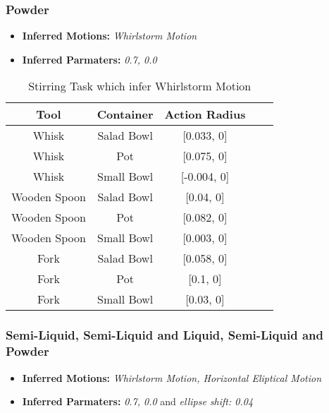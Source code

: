 \subsubsection*{Powder}
\begin{itemize}
    \item \textbf{Inferred Motions:} \textit{Whirlstorm Motion}
    \item \textbf{Inferred Parmaters:} \textit{0.7, 0.0}
\end{itemize}
\begin{table}[H]
    \centering
    \begin{tabular}{|c|c|c|c|c|}
      \hline
      \textbf{Tool} & \textbf{Container} & \textbf{Action Radius}\\
      \hline
      Whisk & Salad Bowl & [0.033, 0] \\
      \hline
      Whisk & Pot & [0.075, 0] \\
      \hline
      Whisk & Small Bowl & [-0.004, 0]\\
      \hline
      Wooden Spoon & Salad Bowl & [0.04, 0] \\
      \hline
      Wooden Spoon & Pot & [0.082, 0] \\
      \hline
      Wooden Spoon & Small Bowl & [0.003, 0] \\
      \hline
      Fork & Salad Bowl & [0.058, 0] \\
      \hline
      Fork & Pot & [0.1, 0] \\
      \hline
      Fork & Small Bowl & [0.03, 0] \\
      \hline
    \end{tabular}
    \caption{Stirring Task which infer Whirlstorm Motion}
    
  \end{table}

\subsubsection{Semi-Liquid, Semi-Liquid and Liquid, Semi-Liquid and Powder}
\begin{itemize}
    \item \textbf{Inferred Motions:} \textit{Whirlstorm Motion, Horizontal Eliptical Motion}
    \item \textbf{Inferred Parmaters:} \textit{0.7, 0.0} and \textit{ellipse shift: 0.04}
\end{itemize}
  
